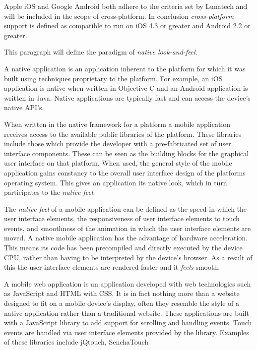 Apple iOS and Google Android both adhere to the criteria set by Lunatech and will be included in the scope of cross-platform. In conclusion \emph{cross-platform} support is defined as compatible to run on iOS 4.3 or greater and Android 2.2 or greater.


This paragraph will define the paradigm of \emph{native look-and-feel}. 

A native application is an application inherent to the platform for which it was built using techniques proprietary to the platform. For example, an iOS application is native when written in Objective-C and an Android application is written in Java.  Native applications are typically fast and can access the device's native API's.

When written in the native framework for a platform a mobile application receives access to the available public libraries of the platform. These libraries include those which provide the developer with a pre-fabricated set of user interface components. These can be seen as the building blocks for the graphical user interface on that platform. When used, the general style of the mobile application gains constancy to the overall user interface design of the platforms operating system. This gives an application its native look, which in turn participates to the \emph{native feel}.


The \emph{native feel} of a mobile application can be defined as the speed in which the user interface elements, the responsiveness of user interface elements to touch events, and smoothness of the animation in which the user interface elements are moved. A native mobile application has the advantage of hardware acceleration. This means its code has been precompiled and directly executed by the device CPU, rather than having to be interpreted by the device's browser. As a result of this the user interface elements are rendered faster and it \emph{feels} smooth.


A mobile web application is an application developed with web technologies such as JavaScript and HTML with CSS. It is in fact nothing more than a website designed to fit on a mobile device's display, often they resemble the style of a native application rather than a traditional website. These applications are built with a JavaScript library to add support for scrolling and handling events. Touch events are handled via user interface elements provided by the library. Examples of these libraries include jQtouch, SenchaTouch

